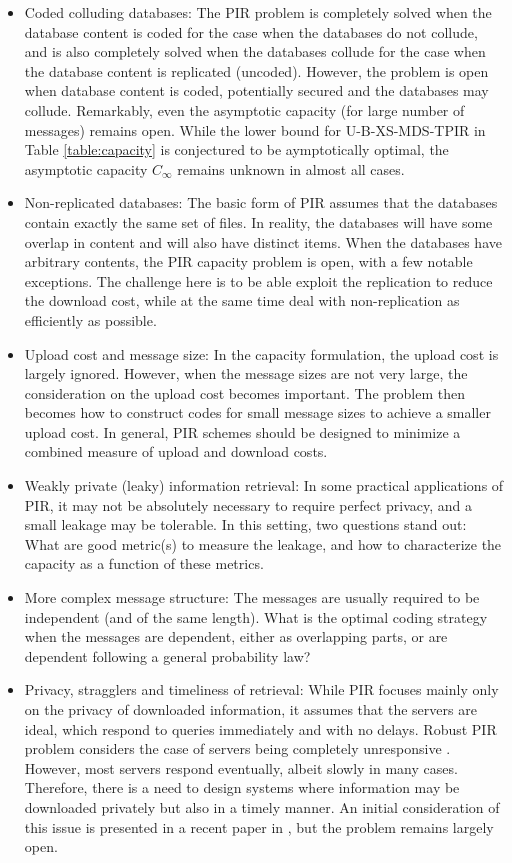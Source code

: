 \documentclass[12pt,draftcls,onecolumn]{IEEEtran}
\begin{document}
\begin{itemize}
\item Coded colluding databases: The PIR problem is completely solved when the database content is coded for the case when the databases do not collude, and is also completely solved when the databases collude for the case when the database content is replicated (uncoded). However, the problem is open when database content is coded, potentially secured and the databases may collude. Remarkably, even the asymptotic capacity (for large number of messages) remains open. While the lower bound for U-B-XS-MDS-TPIR in Table \ref{table:capacity} is conjectured to be aymptotically optimal, the asymptotic capacity $C_\infty$ remains unknown in almost all cases.
\item Non-replicated databases: The basic form of PIR assumes that the databases contain exactly the same set of files. In reality, the databases will have some overlap in content and will also have distinct items. When the databases have arbitrary contents, the PIR capacity problem is open, with a few notable exceptions\cite{raviv2019GPIR, Karim_nonreplicated, Jia_Jafar_GXSTPIR,Sadeh_Gu_Tamo}. The challenge here is to be able exploit the replication to reduce the download cost, while at the same time deal with non-replication as efficiently as possible. 
\item Upload cost and message size: In the capacity formulation, the upload cost is largely ignored. However, when the message sizes are not very large, the consideration on the upload cost becomes important. The problem then becomes how to construct codes for small message sizes to achieve a smaller upload cost. In general, PIR schemes should be designed to minimize a combined measure of upload and download costs. 
\item Weakly private (leaky) information retrieval: In some practical applications of PIR, it may not be absolutely necessary to require perfect privacy, and a small leakage may be tolerable. In this setting, two questions stand out: What are good metric(s) to measure the leakage, and how to characterize the capacity as a function of these metrics. 
\item More complex message structure: The messages are usually required to be independent (and of the same length). What is the optimal coding strategy when the messages are dependent, either as overlapping parts, or are dependent following a general probability law?
\item Privacy, stragglers and timeliness of retrieval: While PIR focuses mainly only on the privacy of downloaded information, it assumes that the servers are ideal, which respond to queries immediately and with no delays. Robust PIR problem considers the case of servers being completely unresponsive \cite{Sun_Jafar_TPIR, bitar2018staircase}. However, most servers respond eventually, albeit slowly in many cases. Therefore, there is a need to design systems where information may be downloaded privately but also in a timely manner. An initial consideration of this issue is presented in a recent paper in \cite{TimelyPIR}, but the problem remains largely open. 
\end{itemize}
\end{document}

